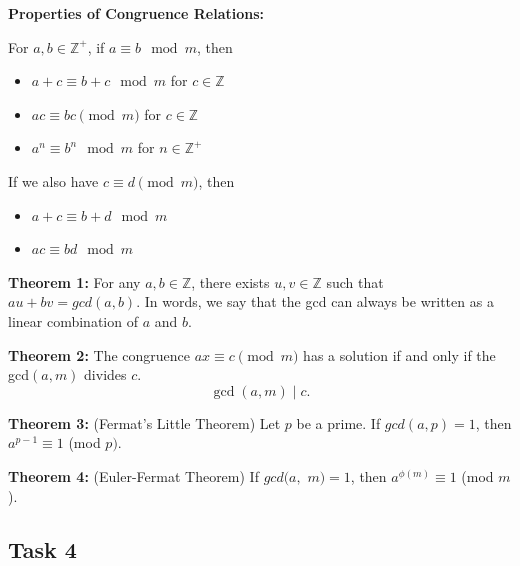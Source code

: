 \documentclass[12pt,letterpaper]{article}
\newcommand\Z{\mathbb Z}
\begin{document}
\textbf{Properties of Congruence Relations:}

For $a,b \in \mathbb{Z}^+$, if $a \equiv b \mod{m}$, then
\begin{itemize}
    \item $a + c\equiv b + c\mod{m}$ for $c \in \mathbb{Z}$
    \item $ac \equiv bc \pmod{m}$ for $c \in \mathbb{Z}$
    \item $a^n \equiv b^n \mod{m}$ for $n \in \mathbb{Z^+}$ 
\end{itemize}
If we also have $c \equiv d \pmod{m}$, then
\begin{itemize}
    \item $a + c\equiv b + d\mod{m}$
    \item $ac\equiv bd\mod{m}$
\end{itemize}

\textbf{Theorem 1:} For any $a,b \in \Z$, there exists $u,v \in \Z$ such that $au + bv = gcd(a,b)$. In words, we say that the gcd can always be written as a linear combination of $a$ and $b$.

\textbf{Theorem 2:} The congruence $ax \equiv c \pmod{m}$ has a solution if and only if the gcd$(a,m)$ divides $c$. 
\[
\gcd(a,m) \mid c.
\]

\textbf{Theorem 3:} (Fermat’s Little Theorem) Let $p$ be a prime. If $gcd(a, p) = 1$, then $a^{p-1} \equiv 1$ (mod $p)$.

\textbf{Theorem 4:} (Euler-Fermat Theorem) If $gcd(a,$ $m) = 1$, then $a^{\phi(m)} \equiv 1$ (mod $m$).

\pagebreak
	\subsection*{Task 4}
\end{document}
